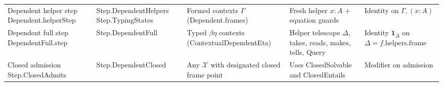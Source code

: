 \documentclass[11pt,a4paper]{article}
\theoremstyle{definition}
\DeclareRobustCommand{\lean}[1]{%
  \ifmmode\text{\normalfont\ttfamily\footnotesize\detokenize{#1}}%
  \else{\normalfont\footnotesize\leanurl{#1}}\fi}
\def\lean#1{#1}%
\begin{document}
\begin{table}[t]
\begin{tabular}{@{}>{\raggedright\arraybackslash}p{3.2cm}>{\raggedright\arraybackslash}p{3.2cm}>{\raggedright\arraybackslash}p{3.0cm}>{\raggedright\arraybackslash}p{3.1cm}>{\raggedright\arraybackslash}p{2.3cm}@{}}
Dependent helper step \newline \lean{Dependent.helperStep} & \lean{Step.DependentHelpers} \newline \lean{Step.TypingStates} & Formed contexts $\Gamma$ (\lean{Dependent.frames}) & Fresh helper $x : A$ + equation guards & Identity on $\Gamma, (x : A)$ \\
Dependent full step \newline \lean{DependentFull.step} & \lean{Step.DependentFull} & Typed $\beta\eta$ contexts \newline (\lean{ContextualDependentEta}) & Helper telescope $\Delta$, takes, reads, makes, tells, \lean{Query} & Identity $\mathbf{1}_{\Delta}$ on $\Delta = f.\mathrm{helpers}.\mathrm{frame}$ \\
Closed admission \newline \lean{Step.ClosedAdmits} & \lean{Step.DependentClosed} & Any $\mathcal{X}$ with designated closed frame $\mathrm{point}$ & Uses \lean{ClosedSolvable} and \lean{ClosedEntails} & Modifier on admission \\
\bottomrule
\end{tabular}
\end{table}
\end{document}
